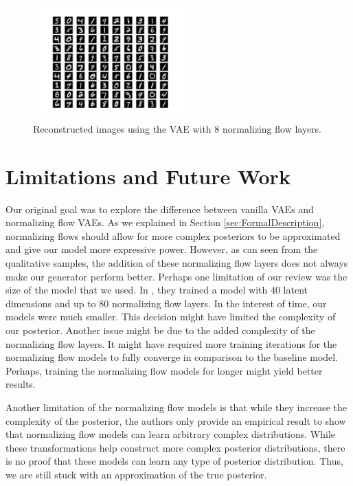 \documentclass{article}
\begin{document}
\begin{figure}[htbp]
\begin{center}
	\includegraphics[width=0.52\textwidth]{reconstruction_8Layers.png}
\caption{Reconstructed images using the VAE with 8 normalizing flow layers.}
\label{fig:NormFlow8}
\end{center}
\end{figure}

\section{Limitations and Future Work}
Our original goal was to explore the difference between vanilla VAEs and normalizing flow VAEs. As we
explained in Section \ref{sec:FormalDescription}, normalizing flows should allow for more complex posteriors 
to be approximated and give our model more expressive power. However, as can seen from the qualitative 
samples, the addition of these normalizing flow layers does not always make our generator perform better. 
Perhaps one limitation of our review was the size of the model that we used. In \citet{RM15}, they trained a 
model with 40 latent dimensions and up to 80 normalizing flow layers. In the interest of time, our models were 
much smaller. This decision might have limited the complexity of our posterior. Another issue might be 
due to the added complexity of the normalizing flow layers. It might have required more training iterations 
for the normalizing flow models to fully converge in comparison to the baseline model. Perhaps, training 
the normalizing flow models for longer might yield better results.

Another limitation of the normalizing flow models is that while they increase the complexity of the posterior, 
the authors only provide an empirical result to show that normalizing flow models can learn arbitrary 
complex distributions. While these transformations help construct more complex posterior distributions, 
there is no proof that these models can learn any type of posterior distribution. Thus, we are still stuck 
with an approximation of the true posterior.
\end{document}
